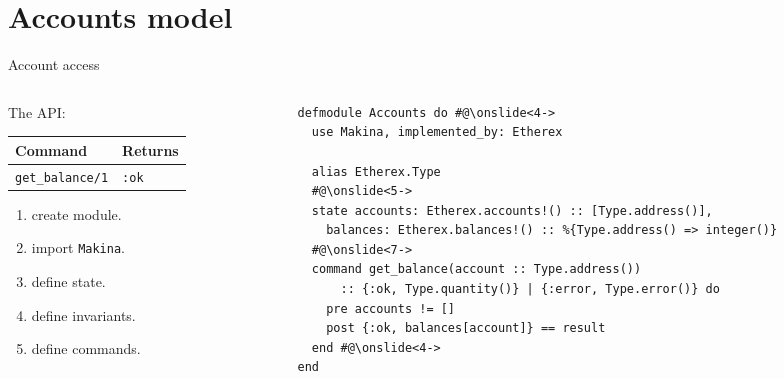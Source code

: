 \documentclass[aspectratio=169, 10pt]{beamer}
\begin{document}
\section{Accounts model}
\label{sec:org6c108b1}
\begin{frame}[label={sec:org6962026},fragile]{Account access}
 \begin{columns}
\begin{column}{0.28\columnwidth}
\onslide<+->
\onslide<+->
The API:

\begin{center}
\begin{tabular}{ll}
Command & Returns\\
\hline
\texttt{get\_balance/1} & \texttt{:ok}\\
\end{tabular}
\end{center}
\onslide<+->
\vspace{0.5cm}
\begin{enumerate}
\item create module.
\onslide<+->
\item import \texttt{Makina}.
\onslide<+->
\item define state.
\onslide<+->
\item define invariants.
\onslide<+->
\item define commands.
\end{enumerate}
\end{column}

\begin{column}{0.68\columnwidth}
\lstset{language=elixir,label= ,caption= ,captionpos=b,numbers=none,style=display}
\begin{lstlisting}
defmodule Accounts do #@\onslide<4->
  use Makina, implemented_by: Etherex

  alias Etherex.Type
  #@\onslide<5->
  state accounts: Etherex.accounts!() :: [Type.address()],
	balances: Etherex.balances!() :: %{Type.address() => integer()}
  #@\onslide<7->
  command get_balance(account :: Type.address())
      :: {:ok, Type.quantity()} | {:error, Type.error()} do
    pre accounts != []
    post {:ok, balances[account]} == result
  end #@\onslide<4->
end
\end{lstlisting}
\end{column}
\end{columns}
\end{frame}
\end{document}
